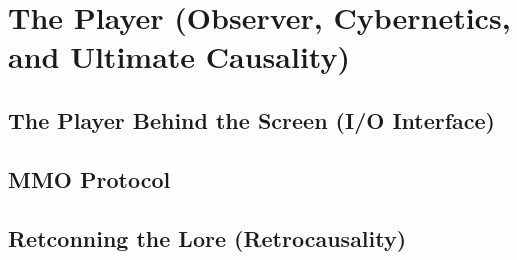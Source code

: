 \documentclass[11pt,a4paper,twoside]{book}
\begin{document}
\part{The Player (Observer, Cybernetics, and Ultimate Causality)}

\chapter{The Player Behind the Screen (I/O Interface)}



\chapter{MMO Protocol}



\chapter{Retconning the Lore (Retrocausality)}



\end{document}
